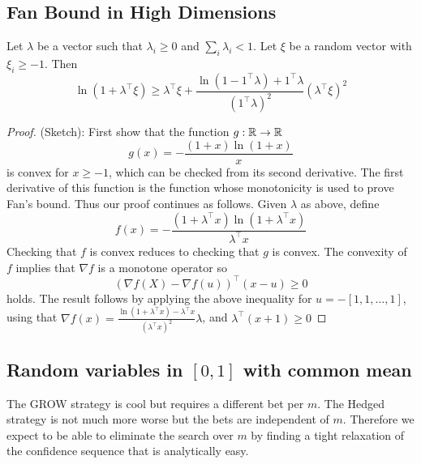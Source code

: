 \subsection{Fan Bound in High Dimensions}
Let $\lambda$ be a vector such that $\lambda_i \geq 0$ and
$\sum_i \lambda_i < 1$. Let $\xi$ be a random vector with
$\xi_i \geq -1$. Then
\[
\ln(1+\lambda^\top \xi) \geq \lambda^\top \xi + \frac{\ln(1-1^\top \lambda) +1^\top \lambda}{(1^\top \lambda)^2} (\lambda^\top \xi)^2
\]
\begin{proof}
(Sketch): First show that the function $g:\mathbb{R}\to\mathbb{R}$
\[
g(x) = -\frac{(1+x)\ln(1+x)}{x}
\]
is convex for $x\geq -1$, which can be checked from its second derivative.
The first derivative of this function is the function
whose monotonicity is used to prove Fan's bound. Thus
our proof continues as follows. Given $\lambda$ as above,
define  
\[
f(x) = -\frac{(1+\lambda^\top x)\ln(1+\lambda^\top x)}{\lambda^\top x}
\]
Checking that $f$ is convex reduces to checking that $g$ is convex.
The convexity of $f$ implies that $\nabla f$ is a monotone operator so
\[
(\nabla f(X) - \nabla f(u))^\top (x-u) \geq 0
\]
holds. The result follows by applying the above inequality for 
$u=-[1,1,\ldots,1]$, using that $\nabla f(x)=\frac{\ln(1+\lambda^\top x)-\lambda^\top x}{(\lambda^\top x)^2}\lambda$, and $\lambda^\top (x+1)\geq 0$
\end{proof}

\subsection{Random variables in $[0,1]$ with common mean}
\label{app:nogrid01}
The GROW strategy is cool but requires a different bet per $m$.
The Hedged strategy is not much more worse but the bets are 
independent of $m$. Therefore we expect to be able to eliminate
the search over $m$ by finding a tight relaxation of the 
confidence sequence that is analytically easy.

